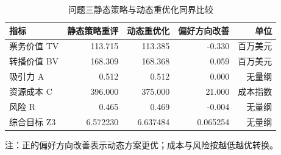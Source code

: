 \begin{table}[H]
\centering
\caption{问题三静态策略与动态重优化同界比较}
\label{tab:q3-static-dynamic}
\small
\begin{tabular}{lrrrr}
\toprule
指标 & 静态策略重评 & 动态重优化 & 偏好方向改善 & 单位 \\
\midrule
票务价值 TV & 113.715 & 113.385 & -0.330 & 百万美元 \\
转播价值 BV & 168.309 & 168.368 & 0.059 & 百万美元 \\
吸引力 A & 0.512 & 0.512 & 0.000 & 无量纲 \\
资源成本 C & 396.000 & 375.000 & 21.000 & 成本指数 \\
风险 R & 0.465 & 0.469 & -0.004 & 无量纲 \\
综合目标 Z3 & 6.572230 & 6.637484 & 0.065254 & 无量纲 \\
\bottomrule
\end{tabular}
\vspace{2pt}
\noindent\begin{minipage}{0.96\textwidth}\footnotesize 注：正的偏好方向改善表示动态方案更优；成本与风险按越低越优转换。\end{minipage}
\end{table}
